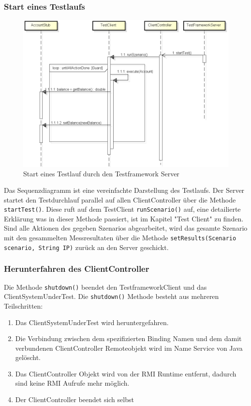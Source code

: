 \subsubsection{Start eines Testlaufs}
\begin{figure}[H]
\begin{center}
\includegraphics[scale=0.4]{image_testFramework/startTest.png}
\end{center}
\caption{Start eines Testlauf durch den Testframework Server}
\end{figure}
Das Sequenzdiagramm ist eine vereinfachte Darstellung des Testlaufs. Der Server startet den Testdurchlauf parallel auf allen ClientController über die Methode \verb+startTest()+. Diese ruft auf dem TestClient \verb+runScenario()+ auf, eine detailierte Erklärung was in dieser Methode passiert, ist im Kapitel "Test Client" zu finden. Sind alle Aktionen des gegeben Szenarios abgearbeitet, wird das gesamte Szenario mit den gesammelten Messresultaten über die Methode \verb+setResults(Scenario scenario, String IP)+ zurück an den Server geschickt.

\subsubsection{Herunterfahren des ClientController}
Die Methode \verb+shutdown()+ be\-endet den Test\-framework\-Client und das Client\-System\-Under\-Test. Die \verb+shutdown()+ Me\-tho\-de besteht aus mehreren Teil\-schritten:
\begin{enumerate}
\item Das ClientSystemUnderTest wird heruntergefahren.
\item Die Verbindung zwischen dem spezifizierten Binding Namen und dem damit verbundenen ClientController Remoteobjekt wird im Name Service von Java gelöscht.
\item Das ClientController Objekt wird von der RMI Run\-time entfernt, da\-durch sind keine RMI Aufrufe mehr möglich.
\item Der ClientController beendet sich selbst
\end{enumerate}


